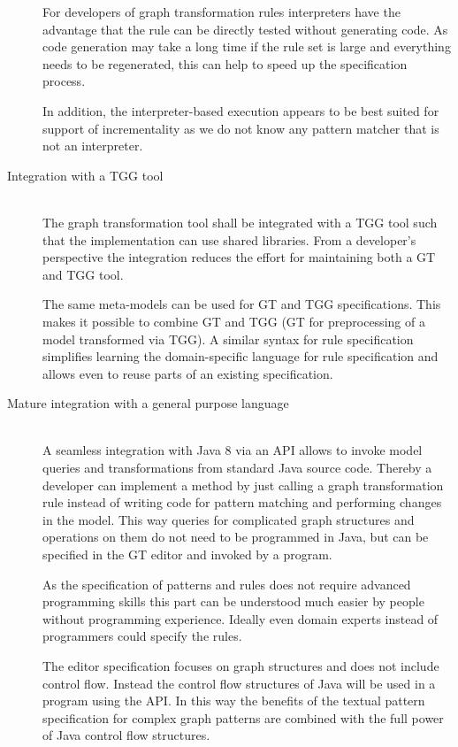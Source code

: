 \begin{description}
		For developers of graph transformation rules interpreters have the advantage that the rule can be directly tested without generating code.
		As code generation may take a long time if the rule set is large and everything needs to be regenerated, this can help to speed up the specification process.

		In addition, the interpreter-based execution appears to be best suited for support of incrementality as we do not know any pattern matcher that is not an interpreter.

\newpage %
	\item[Integration with a TGG tool] ~\\
		The graph transformation tool shall be integrated with a TGG tool such that the implementation can use shared libraries.
		From a developer's perspective the integration reduces the effort for maintaining both a GT and TGG tool.

		The same meta-models can be used for GT and TGG specifications.
		This makes it possible to combine GT and TGG (\eg GT for preprocessing of a model transformed via TGG).
		A similar syntax for rule specification simplifies learning the domain-specific language for rule specification and allows even to reuse parts of an existing specification.

	\item[Mature integration with a general purpose language] ~\\
		A seamless integration with Java 8 via an API allows to invoke model queries and transformations from standard Java source code.
		Thereby a developer can implement a method by just calling a graph transformation rule instead of writing code for pattern matching and performing changes in the model.
		This way queries for complicated graph structures and operations on them do not need to be programmed in Java, but can be specified in the GT editor and invoked by a program.

		As the specification of patterns and rules does not require advanced programming skills this part can be understood much easier by people without programming experience.
		Ideally even domain experts instead of programmers could specify the rules.

		The editor specification focuses on graph structures and does not include control flow.
		Instead the control flow structures of Java will be used in a program using the API.
		In this way the benefits of the textual pattern specification for complex graph patterns are combined with the full power of Java control flow structures.


\end{description}
